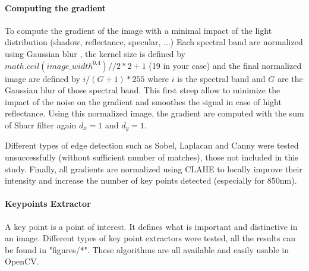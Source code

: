 \documentclass[]{elsarticle}
\begin{document}
	\paragraph{Computing the gradient} To compute the gradient of the image with a minimal impact of the light distribution (shadow, reflectance, specular, ...)
	Each spectral band are normalized using Gaussian blur \cite{sage0303}, the kernel size is defined by $math.ceil(image\_width^{0.4}) // 2 * 2 +1$ (19 in your case)
	and the final normalized image are defined by $i/(G+1)*255$ where $i$ is the spectral band and $G$ are the Gaussian blur of those spectral band.
	This first steep allow to minimize the impact of the noise on the gradient and smoothes the signal in case of hight reflectance.
	Using this normalized image, the gradient are computed with the sum of Sharr filter \cite{Seitz} again $d_x=1$ and $d_y=1$.
	
	Different types of edge detection such as Sobel, Laplacan and Canny were tested unsuccessfully (without sufficient number of matches), those not included in this study. Finally, all gradients are normalized using CLAHE \cite{zuiderveld1994contrast} to locally improve their intensity and increase the number of key points detected (especially for 850nm).
	
	\paragraph{Keypoints Extractor}
	A key point is a point of interest. It defines what is important and distinctive in an image.
	Different types of key point extractors were tested, all the results can be found in "figures/*".
	These algorithms are all available and easily usable in OpenCV.
	
\end{document}
